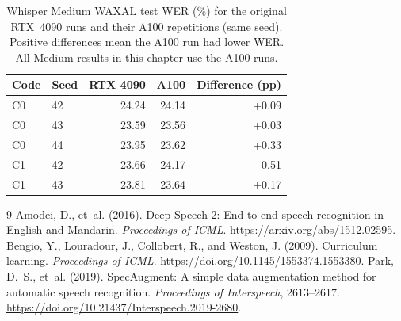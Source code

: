 \documentclass[12pt,a4paper]{report}
\begin{document}
\begin{table}[htbp]\centering\small
\caption{Whisper Medium WAXAL test WER (\%) for the original RTX~4090 runs and
their A100 repetitions (same seed). Positive differences mean the A100 run had
lower WER. All Medium results in this chapter use the A100 runs.}
\label{tab:migration}
\begin{tabular}{llrrr}\toprule
Code & Seed & RTX 4090 & A100 & Difference (pp)\\\midrule
C0 & 42 & 24.24 & 24.14 & +0.09 \\
C0 & 43 & 23.59 & 23.56 & +0.03 \\
C0 & 44 & 23.95 & 23.62 & +0.33 \\
C1 & 42 & 23.66 & 24.17 & -0.51 \\
C1 & 43 & 23.81 & 23.64 & +0.17 \\
\bottomrule\end{tabular}
\end{table}

\begin{thebibliography}{9}
Amodei, D., et~al. (2016). Deep Speech 2: End-to-end speech recognition in
English and Mandarin. \emph{Proceedings of ICML}.
\url{https://arxiv.org/abs/1512.02595}.
Bengio, Y., Louradour, J., Collobert, R., and Weston, J. (2009).
Curriculum learning. \emph{Proceedings of ICML}.
\url{https://doi.org/10.1145/1553374.1553380}.
Park, D.~S., et~al. (2019). SpecAugment: A simple data augmentation method
for automatic speech recognition. \emph{Proceedings of Interspeech}, 2613--2617.
\url{https://doi.org/10.21437/Interspeech.2019-2680}.
\end{thebibliography}
\end{document}

